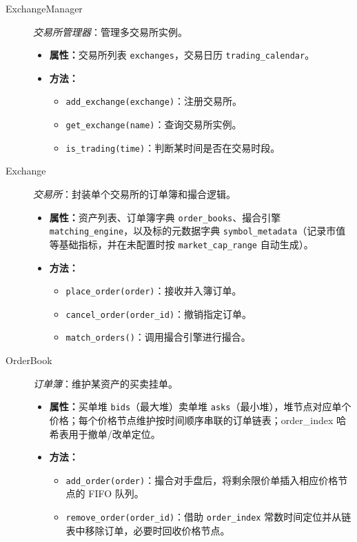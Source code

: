 \begin{description}
  \item[ExchangeManager] \emph{交易所管理器}：管理多交易所实例。
  \begin{itemize}
    \item \textbf{属性：}交易所列表 \verb|exchanges|，交易日历 \verb|trading_calendar|。
    \item \textbf{方法：}
      \begin{itemize}
        \item \verb|add_exchange(exchange)|：注册交易所。
        \item \verb|get_exchange(name)|：查询交易所实例。
        \item \verb|is_trading(time)|：判断某时间是否在交易时段。
      \end{itemize}
  \end{itemize}
  \item[Exchange] \emph{交易所}：封装单个交易所的订单簿和撮合逻辑。
  \begin{itemize}
    \item \textbf{属性：}资产列表、订单簿字典 \verb|order_books|、撮合引擎 \verb|matching_engine|，以及标的元数据字典 \verb|symbol_metadata|（记录市值等基础指标，并在未配置时按 \verb|market_cap_range| 自动生成）。
    \item \textbf{方法：}
      \begin{itemize}
        \item \verb|place_order(order)|：接收并入簿订单。
        \item \verb|cancel_order(order_id)|：撤销指定订单。
        \item \verb|match_orders()|：调用撮合引擎进行撮合。
      \end{itemize}
  \end{itemize}
  \item[OrderBook] \emph{订单簿}：维护某资产的买卖挂单。
  \begin{itemize}
    \item \textbf{属性：}买单堆 \verb|bids|（最大堆）卖单堆 \verb|asks|（最小堆），堆节点对应单个价格；每个价格节点维护按时间顺序串联的订单链表；order\_index 哈希表用于撤单/改单定位。
    \item \textbf{方法：}
      \begin{itemize}
        \item \verb|add_order(order)|：撮合对手盘后，将剩余限价单插入相应价格节点的 FIFO 队列。
        \item \verb|remove_order(order_id)|：借助 \verb|order_index| 常数时间定位并从链表中移除订单，必要时回收价格节点。

\end{itemize}
\end{itemize}
\end{description}
